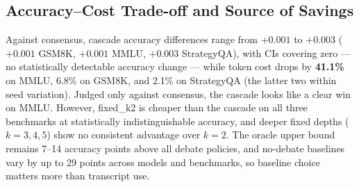 \documentclass{llncs}
\begin{document}
\subsection{Accuracy--Cost Trade-off and Source of Savings}
\label{sec:tradeoff}

\begin{table}[t]
\caption{Policy comparison against consensus (4,500 debates; accuracy / tokens as \% of \textit{always}; $\Delta$Acc is the paired accuracy difference vs.\ consensus; $\Delta$Token is the \emph{relative} token reduction vs.\ consensus, i.e.\ (consensus\% $-$ policy\%)/consensus\%, not a percentage-point difference).}
\label{tab:all_policies}
\centering
{}
\end{table}

Against consensus, cascade accuracy differences range from $+0.001$ to $+0.003$ ($+0.001$ GSM8K, $+0.001$ MMLU, $+0.003$ StrategyQA), with CIs covering zero --- no statistically detectable accuracy change --- while token cost drops by \textbf{41.1\%} on MMLU, 6.8\% on GSM8K, and 2.1\% on StrategyQA (the latter two within seed variation). Judged only against consensus, the cascade looks like a clear win on MMLU. However, fixed\_k2 is cheaper than the cascade on all three benchmarks at statistically indistinguishable accuracy, and deeper fixed depths ($k=3,4,5$) show no consistent advantage over $k=2$. The oracle upper bound remains 7--14 accuracy points above all debate policies, and no-debate baselines vary by up to 29 points across models and benchmarks, so baseline choice matters more than transcript use.
\end{document}
